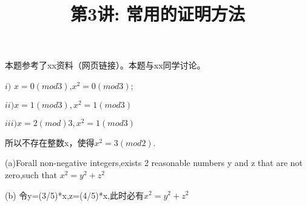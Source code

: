 \documentclass[a4paper, justified]{tufte-handout}
\title{第3讲: 常用的证明方法}
\date{\zhtoday} %
\begin{document}
\maketitle
\noplagiarism %
\begin{abstract}
  \begin{center}{}
  \end{center}
\end{abstract}
\beginrequired

\begin{problem}[UD Problem $5.12$: $3k + 2$]
\end{problem}

\begin{remark}
本题参考了xx资料（网页链接）。本题与xx同学讨论。
\end{remark}

\begin{solution}
\quad \quad $i)$ $x=0(mod 3)$,$x^2=0(mod 3)$;

$ii) x=1(mod 3),x^2=1(mod 3)$

$iii) x=2(mod)3,x^2=1(mod 3)$

所以不存在整数x，使得$x^2=3(mod 2)$.

\end{solution}

\begin{problem}
\end{problem}

\begin{solution}
\quad \quad (a)Forall non-negative integers,exists 2 reasonable numbers y and z that are not zero,such that $x^2=y^2+z^2$

(b) 令y=(3/5)*x,z=(4/5)*x,此时必有$x^2=y^2+z^2$

\end{solution}
\end{document}

